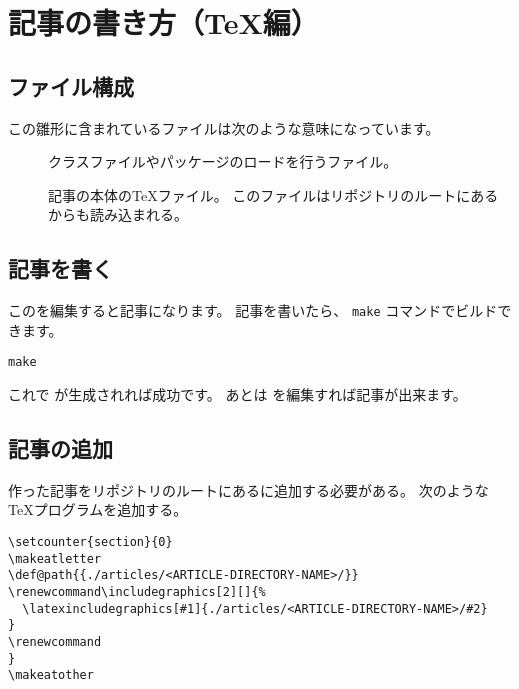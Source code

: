 \subtitle{ヘッダの見出し}
\author{ほげ}

\chapter{記事の書き方（\TeX 編）}

\section{ファイル構成}

この雛形に含まれているファイルは次のような意味になっています。

\begin{description}
  \item[]
    クラスファイルやパッケージのロードを行うファイル。
  \item[]
    記事の本体の\TeX ファイル。
    このファイルはリポジトリのルートにあるからも読み込まれる。
\end{description}

\section{記事を書く}

このを編集すると記事になります。
記事を書いたら、 \lstinline|make| コマンドでビルドできます。

\begin{lstlisting}
make
\end{lstlisting}

これで が生成されれば成功です。
あとは を編集すれば記事が出来ます。

\section{記事の追加}

作った記事をリポジトリのルートにあるに追加する必要がある。
次のような\TeX プログラムを追加する。

\begin{lstlisting}
\setcounter{section}{0}
\makeatletter
\def@path{{./articles/<ARTICLE-DIRECTORY-NAME>/}}
\renewcommand\includegraphics[2][]{%
  \latexincludegraphics[#1]{./articles/<ARTICLE-DIRECTORY-NAME>/#2}
}
\renewcommand
}
\makeatother


\end{lstlisting}
